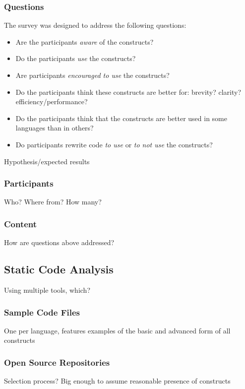 \documentclass{article}
\begin{document}
        \subsubsection{Questions}
            The survey was designed to address the following questions:
            \begin{itemize}
                \item Are the participants \emph{aware} of the constructs?
                \item Do the participants \emph{use} the constructs?
                \item Are participants \emph{encouraged to use} the constructs?
                \item Do the participants think these constructs are better for:
                    \subitem brevity?
                    \subitem clarity?
                    \subitem efficiency/performance?
                \item Do the participants think that the constructs are better used in some languages than in others?
                \item Do participants rewrite code \emph{to use} or \emph{to not use} the constructs?
            \end{itemize}      
            
            Hypothesis/expected results
        \subsubsection{Participants}
            Who?
            Where from?
            How many?
        \subsubsection{Content}
            How are questions above addressed?
    \subsection{Static Code Analysis}
            Using multiple tools, which?
        \subsubsection{Sample Code Files}
            One per language, features examples of the basic and advanced form of all constructs
        \subsubsection{Open Source Repositories}
            Selection process?
            Big enough to assume reasonable presence of constructs
\end{document}
